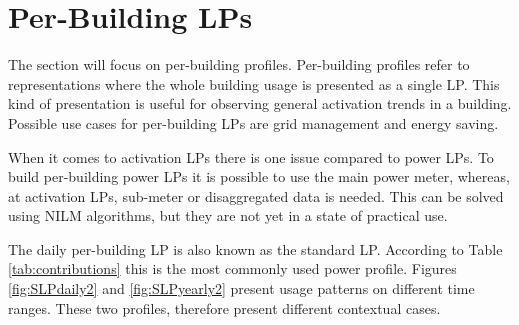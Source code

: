 \section{Per-Building LPs}
\label{sec:per_building}
The section will focus on per-building profiles.
Per-building profiles refer to representations where the whole building usage is presented as a single LP.
This kind of presentation is useful for observing general activation trends in a building.
Possible use cases for per-building LPs are grid management and energy saving.

When it comes to activation LPs there is one issue compared to power LPs.
To build per-building power LPs it is possible to use the main power meter, whereas, at activation LPs, sub-meter or disaggregated data is needed.
This can be solved using NILM algorithms, but they are not yet in a state of practical use.

The daily per-building LP is also known as the standard LP. 
According to Table \ref{tab:contributions} this is the most commonly used power profile.
Figures \ref{fig:SLPdaily2} and \ref{fig:SLPyearly2} present usage patterns on different time ranges. 
These two profiles, therefore present different contextual cases.

